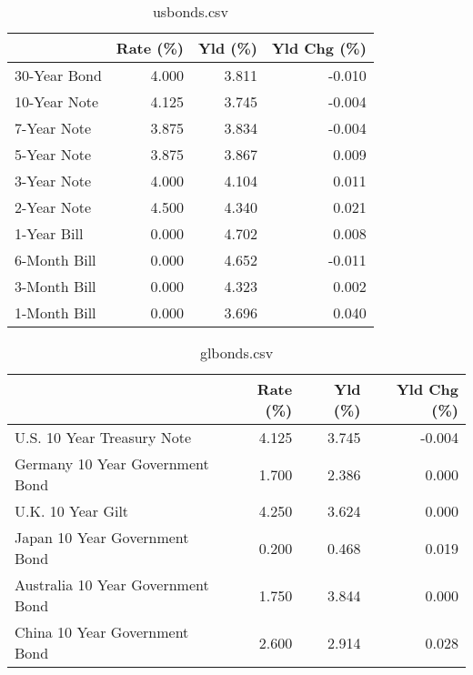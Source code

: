 \documentclass{article}%
\begin{document}
%


\begin{table}[htbp]%
\caption{usbonds.csv}%
\centering%
\begin{adjustbox}{width=1\textwidth}%
\begin{tabular}{lrrr}
\toprule
             &  Rate (\%) &  Yld (\%) &  Yld Chg (\%) \\
\midrule
30-Year Bond &     4.000 &    3.811 &       -0.010 \\
10-Year Note &     4.125 &    3.745 &       -0.004 \\
 7-Year Note &     3.875 &    3.834 &       -0.004 \\
 5-Year Note &     3.875 &    3.867 &        0.009 \\
 3-Year Note &     4.000 &    4.104 &        0.011 \\
 2-Year Note &     4.500 &    4.340 &        0.021 \\
 1-Year Bill &     0.000 &    4.702 &        0.008 \\
6-Month Bill &     0.000 &    4.652 &       -0.011 \\
3-Month Bill &     0.000 &    4.323 &        0.002 \\
1-Month Bill &     0.000 &    3.696 &        0.040 \\
\bottomrule
\end{tabular}
%
\end{adjustbox}%
\end{table}

%


\begin{table}[htbp]%
\caption{glbonds.csv}%
\centering%
\begin{adjustbox}{width=1\textwidth}%
\begin{tabular}{lrrr}
\toprule
                                  &  Rate (\%) &  Yld (\%) &  Yld Chg (\%) \\
\midrule
       U.S. 10 Year Treasury Note &     4.125 &    3.745 &       -0.004 \\
  Germany 10 Year Government Bond &     1.700 &    2.386 &        0.000 \\
                U.K. 10 Year Gilt &     4.250 &    3.624 &        0.000 \\
    Japan 10 Year Government Bond &     0.200 &    0.468 &        0.019 \\
Australia 10 Year Government Bond &     1.750 &    3.844 &        0.000 \\
    China 10 Year Government Bond &     2.600 &    2.914 &        0.028 \\
\bottomrule
\end{tabular}
%
\end{adjustbox}%
\end{table}
\end{document}
